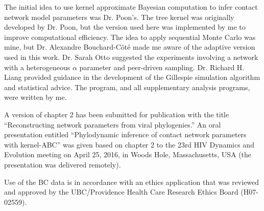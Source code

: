 The initial idea to use kernel approximate Bayesian computation to infer
contact network model parameters was Dr. Poon's. The tree kernel was originally
developed by Dr. Poon, but the version used here was implemented by me to
improve computational efficiency. The idea to apply sequential Monte Carlo was
mine, but Dr. Alexandre Bouchard-C\^ot\'e made me aware of the adaptive version
used in this work. Dr. Sarah Otto suggested the experiments involving a network
with a heterogeneous $\alpha$ parameter and peer-driven sampling. Dr. Richard
H. Liang provided guidance in the development of the Gillespie simulation
algorithm and statistical advice. The  program, and all
supplementary analysis programs, were written by me.

A version of chapter 2 has been submitted for publication with the title
``Reconstructing network parameters from viral phylogenies.'' An oral
presentation entitled ``Phylodynamic inference of contact network parameters
with kernel-ABC'' was given based on chapter 2 to the 23rd HIV Dynamics and
Evolution meeting on April 25, 2016, in Woods Hole, Massachusetts, USA (the
presentation was delivered remotely). 

Use of the BC data is in accordance with an ethics application that was
reviewed and approved by the UBC/Providence Health Care Research Ethics Board
(H07-02559).
